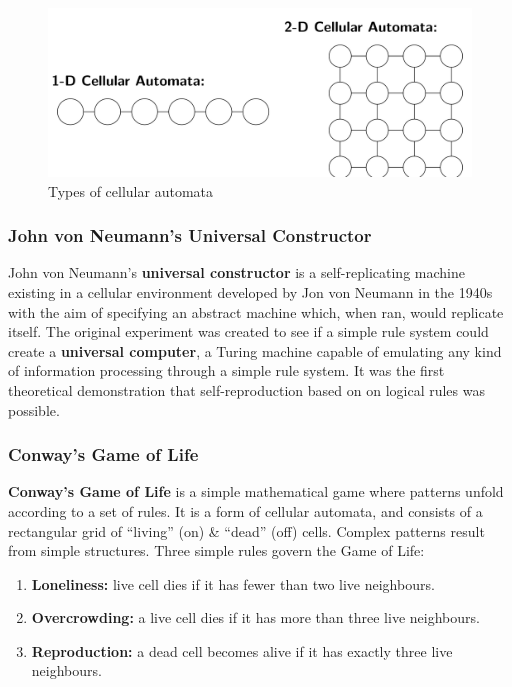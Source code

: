 \documentclass[a4paper,11pt]{article}
\begin{document}
\begin{figure}[H]
    \centering
    \includegraphics[width=\textwidth]{./images/typesofcellularautomata.png}
    \caption{ Types of cellular automata }
\end{figure}

\subsubsection{John von Neumann's Universal Constructor}
John von Neumann's \textbf{universal constructor} is a self-replicating machine existing in a cellular environment developed by Jon von Neumann in the 1940s with the aim of specifying an abstract machine which, when ran, would replicate itself.
The original experiment was created to see if a simple rule system could create a \textbf{universal computer}, a Turing machine capable of emulating any kind of information processing through a simple rule system.
It was the first theoretical demonstration that self-reproduction based on on logical rules was possible.

\subsubsection{Conway's Game of Life}
\textbf{Conway's Game of Life} is a simple mathematical game where patterns unfold according to a set of rules.
It is a form of cellular automata, and consists of a rectangular grid of ``living'' (on) \& ``dead'' (off) cells.
Complex patterns result from simple structures.
Three simple rules govern the Game of Life:
\begin{enumerate}
    \item   \textbf{Loneliness:} live cell dies if it has fewer than two live neighbours.
    \item   \textbf{Overcrowding:} a live cell dies if it has more than three live neighbours.
    \item   \textbf{Reproduction:} a dead cell becomes alive if it has exactly three live neighbours.
\end{enumerate}
\end{document}
